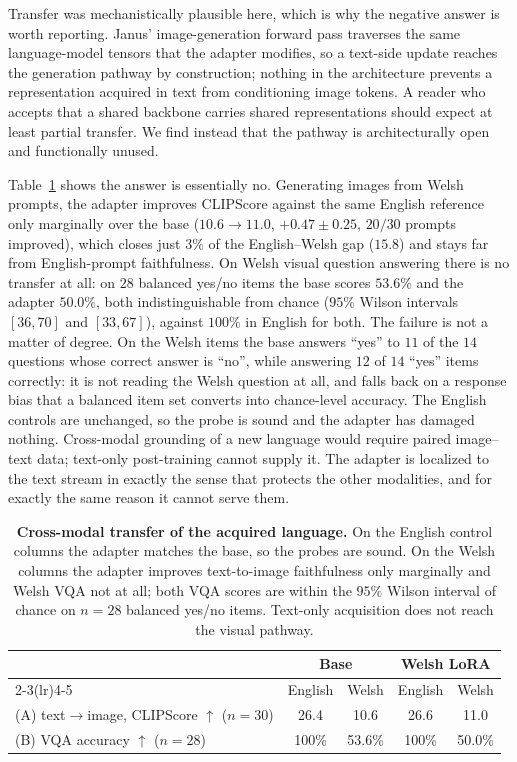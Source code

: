 \documentclass{article}
\begin{document}
Transfer was mechanistically plausible here, which is why the negative answer is
worth reporting. Janus' image-generation forward pass traverses the same
language-model tensors that the adapter modifies, so a text-side update reaches
the generation pathway by construction; nothing in the architecture prevents a
representation acquired in text from conditioning image tokens. A reader who
accepts that a shared backbone carries shared representations should expect at
least partial transfer. We find instead that the pathway is architecturally open
and functionally unused.

Table~\ref{tab:xmodal} shows the answer is essentially no. Generating images from
Welsh prompts, the adapter improves CLIPScore against the same English reference
only marginally over the base ($10.6\to11.0$, $+0.47\pm0.25$, $20/30$ prompts
improved), which closes just $3\%$ of the English--Welsh gap ($15.8$) and stays
far from English-prompt faithfulness. On Welsh visual question answering there is
no transfer at all: on $28$ balanced yes/no items the base scores $53.6\%$ and
the adapter $50.0\%$, both indistinguishable from chance ($95\%$ Wilson intervals
$[36,70]$ and $[33,67]$), against $100\%$ in English for both. The failure is not
a matter of degree. On the Welsh items the base answers ``yes'' to $11$ of the
$14$ questions whose correct answer is ``no'', while answering $12$ of $14$
``yes'' items correctly: it is not reading the Welsh question at all, and falls
back on a response bias that a balanced item set converts into chance-level
accuracy. The English controls are unchanged, so the probe is sound and the
adapter has damaged nothing. Cross-modal grounding of a new language would
require paired image--text data; text-only post-training cannot supply it. The
adapter is localized to the text stream in exactly the sense that protects the
other modalities, and for exactly the same reason it cannot serve them.

\begin{table}[t]
\caption{\textbf{Cross-modal transfer of the acquired language.} On the English
control columns the adapter matches the base, so the probes are sound. On the
Welsh columns the adapter improves text-to-image faithfulness only marginally and
Welsh VQA not at all; both VQA scores are within the $95\%$ Wilson interval of
chance on $n{=}28$ balanced yes/no items. Text-only acquisition does not reach
the visual pathway.}
\label{tab:xmodal}
\centering\small
\begin{tabular}{lcccc}
\toprule
& \multicolumn{2}{c}{Base} & \multicolumn{2}{c}{Welsh LoRA} \\
\cmidrule(lr){2-3}\cmidrule(lr){4-5}
& English & Welsh & English & Welsh \\
\midrule
(A) text$\to$image, CLIPScore $\uparrow$ ($n{=}30$) & 26.4 & 10.6 & 26.6 & 11.0 \\
(B) VQA accuracy $\uparrow$ ($n{=}28$)              & 100\% & 53.6\% & 100\% & 50.0\% \\
\bottomrule
\end{tabular}
\end{table}
\end{document}
